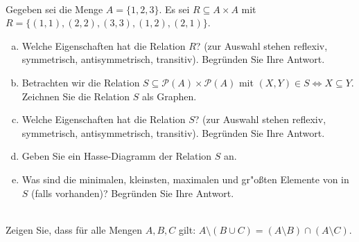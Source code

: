 \\
Gegeben sei die Menge $A=\{1,2,3\}$. Es sei $R\subseteq A\times A$ mit $R=\{(1,1),(2,2),(3,3),(1,2),(2,1)\}$.
\begin{enumerate}[a)]
    \item Welche Eigenschaften hat die Relation $R$? (zur Auswahl stehen reflexiv, symmetrisch, antisymmetrisch, transitiv). Begründen Sie Ihre Antwort.
    \item Betrachten wir die Relation $S\subseteq \mathscr{P}(A)\times \mathscr{P}(A)$ mit $(X,Y)\in S\Leftrightarrow X\subseteq Y$. Zeichnen Sie die Relation $S$ als Graphen.
    \item Welche Eigenschaften hat die Relation $S$? (zur Auswahl stehen reflexiv, symmetrisch, antisymmetrisch, transitiv). Begründen Sie Ihre Antwort.
    \item Geben Sie ein Hasse-Diagramm der Relation $S$ an.
    \item Was sind die minimalen, kleinsten, maximalen und gr"o{\ss}ten Elemente von in $S$ (falls vorhanden)? Begründen Sie Ihre Antwort.

\end{enumerate}

\\
Zeigen Sie, dass für alle Mengen $A,B,C$ gilt: $A\setminus (B\cup C) = (A\setminus B)\cap (A\setminus C)$.

\hspace{5cm}

